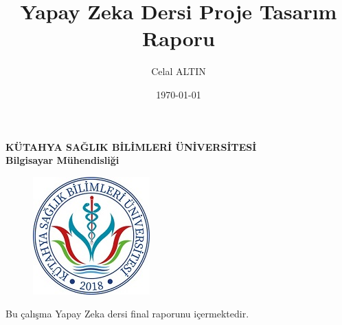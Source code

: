 \documentclass[12pt, a4paper]{article}
\title{ Yapay Zeka Dersi Proje Tasarım Raporu}
\author{Celal ALTIN}
\date{\today}
\begin{document}
	\textbf{KÜTAHYA SAĞLIK BİLİMLERİ ÜNİVERSİTESİ}\centering\\
	\textbf{Bilgisayar Mühendisliği}\centering
	\begin{figure}[!h]
		\centering
		\includegraphics{ksbu.png}
	\end{figure}
	\thispagestyle{empty}
	
	\maketitle\raggedright
	\maketitle\raggedright
	\maketitle
	Bu çalışma Yapay Zeka dersi final raporunu içermektedir. 
	
	
	\newpage
\end{document}
